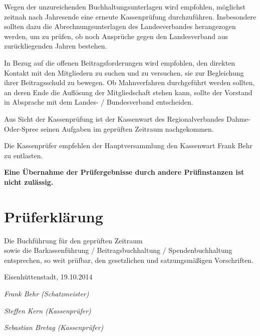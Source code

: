 \documentclass[%
	titlepage,oneside,12pt,headlines=1.5,numbers=noenddot, chapterprefix=false,parskip=full-,DIV=14,pagesize]{scrreprt}
\begin{document}
Wegen der unzureichenden Buchhaltungsunterlagen wird empfohlen, möglichst zeitnah nach Jahresende eine erneute Kassenprüfung durchzuführen. Insbesondere sollten dazu die Abrechnungsunterlagen des Landesverbandes herangezogen werden, um zu prüfen, ob noch Ansprüche gegen den Landesverband aus zurückliegenden Jahren bestehen.

In Bezug auf die offenen Beitragsforderungen wird empfohlen, den direkten Kontakt mit den Mitgliedern zu suchen und zu versuchen, sie zur Begleichung ihrer Beitragsschuld zu bewegen. Ob Mahnverfahren durchgeführt werden sollten, an deren Ende die Auflösung der Mitgliedschaft stehen kann, sollte der Vorstand in Absprache mit dem Landes- / Bundesverband entscheiden.

Aus Sicht der Kassenprüfung ist der Kassenwart des Regionalverbandes Dahme-Oder-Spree seinen Aufgaben im geprüften Zeitraum nachgekommen.

Die Kassenprüfer empfehlen der Hauptversammlung den Kassenwart Frank Behr zu entlasten.

\textbf{Eine Übernahme der Prüfergebnisse durch andere Prüfinstanzen ist nicht zulässig.}

\chapter{Prüferklärung}
\begin{center}
Die Buchführung für den geprüften Zeitraum\\ sowie die Barkassenführung / Beitragsbuchhaltung / Spendenbuchhaltung\\ entsprechen, so weit prüfbar, den gesetzlichen und satzungsmäßigen Vorschriften.
\end{center}

Eisenhüttenstadt, 19.10.2014\bigskip\bigskip


\textit{Frank Behr (Schatzmeister)}\bigskip\bigskip


\textit{Steffen Kern (Kassenprüfer)}\bigskip\bigskip


\textit{Sebastian Bretag (Kassenprüfer)}
\end{document}
